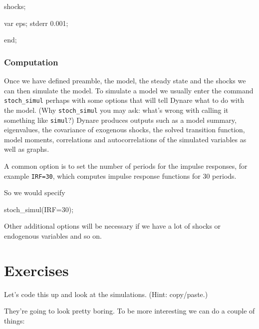 \documentclass[
  letterpaper,
]{book}
\newenvironment{Shaded}{\begin{snugshade}}{\end{snugshade}}
\newcommand{\FloatTok}[1]{\textcolor[rgb]{0.68,0.00,0.00}{#1}}
\newcommand{\KeywordTok}[1]{\textcolor[rgb]{0.00,0.23,0.31}{#1}}
\newcommand{\NormalTok}[1]{\textcolor[rgb]{0.00,0.23,0.31}{#1}}
\newcommand{\OperatorTok}[1]{\textcolor[rgb]{0.37,0.37,0.37}{#1}}
\newcommand{\VariableTok}[1]{\textcolor[rgb]{0.07,0.07,0.07}{#1}}
\begin{document}
\begin{Shaded}
\begin{Highlighting}[]
\VariableTok{shocks}\OperatorTok{;}

    \VariableTok{var} \VariableTok{eps}\OperatorTok{;}
    \VariableTok{stderr} \FloatTok{0.001}\OperatorTok{;}

\KeywordTok{end}\OperatorTok{;}
\end{Highlighting}
\end{Shaded}

\hypertarget{computation}{%
\subsubsection{Computation}\label{computation}}

Once we have defined preamble, the model, the steady state and the
shocks we can then simulate the model. To simulate a model we usually
enter the command \texttt{stoch\_simul} perhaps with some options that
will tell Dynare what to do with the model. (Why \texttt{stoch\_simul}
you may ask: what's wrong with calling it something like
\texttt{simul}?) Dynare produces outputs such as a model summary,
eigenvalues, the covariance of exogenous shocks, the solved transition
function, model moments, correlations and autocorrelations of the
simulated variables as well as graphs.

A common option is to set the number of periods for the impulse
responses, for example \texttt{IRF=30}, which computes impulse response
functions for 30 periods.

So we would specify

\begin{Shaded}
\begin{Highlighting}[]
\VariableTok{stoch\_simul}\NormalTok{(}\VariableTok{IRF}\OperatorTok{=}\FloatTok{30}\NormalTok{)}\OperatorTok{;}
\end{Highlighting}
\end{Shaded}

Other additional options will be necessary if we have a lot of shocks or
endogenous variables and so on.

\hypertarget{exercises}{%
\section{Exercises}\label{exercises}}

Let's code this up and look at the simulations. (Hint: copy/paste.)

They're going to look pretty boring. To be more interesting we can do a
couple of things:
\end{document}
